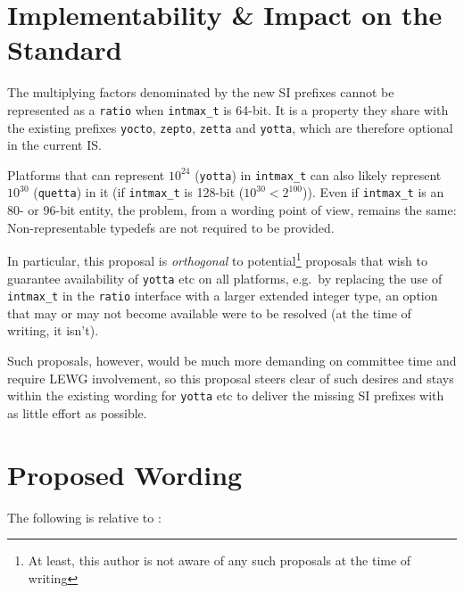 \documentclass[11pt]{article}
\newcommand{\intmaxt}{\texttt{intmax\_t}}
\newcommand{\yocto}{\texttt{yocto}}
\newcommand{\zepto}{\texttt{zepto}}
\newcommand{\zetta}{\texttt{zetta}}
\newcommand{\yotta}{\texttt{yotta}}
\newcommand{\quetta}{\texttt{quetta}}
\begin{document}
\section{Implementability \& Impact on the Standard}

The multiplying factors denominated by the new SI prefixes cannot be
represented as a \texttt{ratio} when \intmaxt{} is 64-bit. It is a
property they share with the existing prefixes \yocto, \zepto,
\zetta{} and \yotta, which are therefore optional in the current
IS.

Platforms that can represent $10^{24}$ (\yotta) in \intmaxt{} can also
likely represent $10^{30}$ (\quetta) in it (if \intmaxt{} is 128-bit
($10^{30}<2^{100}$)). Even if \intmaxt{} is an 80- or 96-bit entity,
the problem, from a wording point of view, remains the same:
Non-representable typedefs are not required to be provided.

In particular, this proposal is \emph{orthogonal} to
potential\footnote{At least, this author is not aware of any such
  proposals at the time of writing} proposals that wish to guarantee
availability of \yotta{} etc on all platforms, e.g.\ by replacing the
use of \intmaxt{} in the \texttt{ratio} interface with a larger
extended integer type, an option that may or may not become available
were \cite{gb80} to be resolved (at the time of writing, it isn't).

Such proposals, however, would be much more demanding on committee
time and require LEWG involvement, so this proposal steers clear of
such desires and stays within the existing wording for \yotta{} etc to
deliver the missing SI prefixes with as little effort as possible.

\section{Proposed Wording}

The following is relative to \cite{cpp23}:
\end{document}
